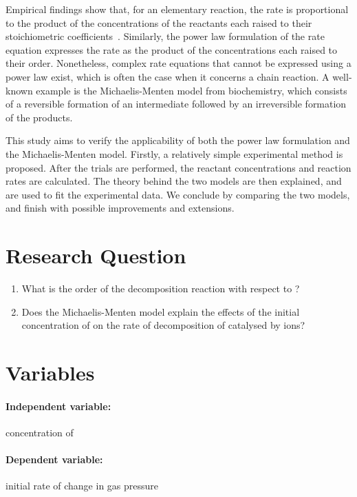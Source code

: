 \documentclass[a4paper, 12pt]{article}
\begin{document}
Empirical findings show that, for an elementary reaction, the rate is proportional to the product of the concentrations of the reactants each raised to their stoichiometric coefficients~\cite{elementary_rxn}. Similarly, the power law formulation of the rate equation expresses the rate as the product of the concentrations each raised to their order. Nonetheless, complex rate equations that cannot be expressed using a power law exist, which is often the case when it concerns a chain reaction. A well-known example is the Michaelis-Menten model from biochemistry, which consists of a reversible formation of an intermediate followed by an irreversible formation of the products.

This study aims to verify the applicability of both the power law formulation and the Michaelis-Menten model. Firstly, a relatively simple experimental method is proposed. After the trials are performed, the reactant concentrations and reaction rates are calculated. The theory behind the two models are then explained, and are used to fit the experimental data. We conclude by comparing the two models, and finish with possible improvements and extensions.


\section*{Research Question}
\begin{enumerate}
    \item What is the order of the decomposition reaction with respect to ?
    \item Does the Michaelis-Menten model explain the effects of the initial concentration of  on the rate of decomposition of  catalysed by  ions?
\end{enumerate}

\section*{Variables}
\paragraph{Independent variable:}
concentration of 

\paragraph{Dependent variable:}
initial rate of change in gas pressure
\end{document}

